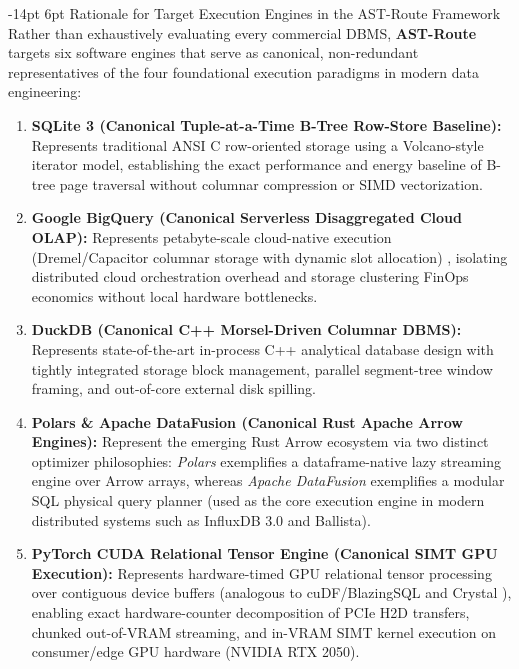\documentclass[10pt,a4paper]{article}
\makeatletter
\renewcommand\subsection{\@startsection{subsection}{2}{\z@}%
  {-14pt \@plus -3pt \@minus -1.5pt}%
  {6pt \@plus 1.5pt}%
  {\normalfont\normalsize\bfseries}}
\makeatother
\begin{document}
\subsection{Rationale for Target Execution Engines in the AST-Route Framework}
Rather than exhaustively evaluating every commercial DBMS, \textbf{AST-Route} targets six software engines that serve as canonical, non-redundant representatives of the four foundational execution paradigms in modern data engineering:
\begin{enumerate}[leftmargin=1.5em,itemsep=2pt]
    \item \textbf{SQLite 3 (Canonical Tuple-at-a-Time B-Tree Row-Store Baseline):} Represents traditional ANSI C row-oriented storage using a Volcano-style iterator model, establishing the exact performance and energy baseline of B-tree page traversal without columnar compression or SIMD vectorization.
    \item \textbf{Google BigQuery (Canonical Serverless Disaggregated Cloud OLAP):} Represents petabyte-scale cloud-native execution (Dremel/Capacitor columnar storage with dynamic slot allocation) \cite{melnik2020dremel}, isolating distributed cloud orchestration overhead and storage clustering FinOps economics without local hardware bottlenecks.
    \item \textbf{DuckDB (Canonical C++ Morsel-Driven Columnar DBMS):} Represents state-of-the-art in-process C++ analytical database design \cite{raasveldt2019duckdb, kuiper2024duckdb_ooc} with tightly integrated storage block management, parallel segment-tree window framing, and out-of-core external disk spilling.
    \item \textbf{Polars \& Apache DataFusion (Canonical Rust Apache Arrow Engines):} Represent the emerging Rust Arrow ecosystem via two distinct optimizer philosophies: \emph{Polars} exemplifies a dataframe-native lazy streaming engine over Arrow arrays, whereas \emph{Apache DataFusion} \cite{lamb2024datafusion} exemplifies a modular SQL physical query planner (used as the core execution engine in modern distributed systems such as InfluxDB 3.0 and Ballista).
    \item \textbf{PyTorch CUDA Relational Tensor Engine (Canonical SIMT GPU Execution):} Represents hardware-timed GPU relational tensor processing over contiguous device buffers (analogous to cuDF/BlazingSQL \cite{kim2022blazingsql} and Crystal \cite{shanbhag2020crystal}), enabling exact hardware-counter decomposition of PCIe H2D transfers, chunked out-of-VRAM streaming, and in-VRAM SIMT kernel execution on consumer/edge GPU hardware (NVIDIA RTX 2050).
\end{enumerate}
\end{document}
